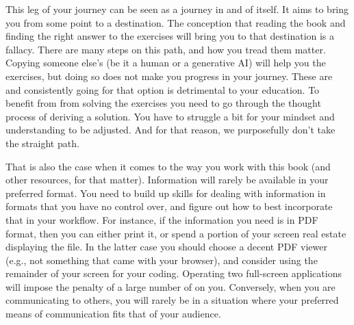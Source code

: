 This leg of your journey can be seen as a journey in and of itself. It aims to bring you from some point to a destination. The conception that reading the book and finding the right answer to the exercises will bring you to that destination is a fallacy. There are many steps on this path, and how you tread them matter.
Copying someone else's  (be it a human or a generative AI) will help you  the exercises, but doing so does not make you progress in your journey. These are  and consistently going for that option is detrimental to your education. To benefit from from solving the exercises you need to go through the thought process of deriving a solution. You have to struggle a bit for your mindset and understanding to be adjusted. And for that reason, we purposefully don't take the straight path.

That is also the case when it comes to the way you work with this book (and other resources, for that matter). Information will rarely be available in your preferred format. You need to build up skills for dealing with information in formats that you have no control over, and figure out how to best incorporate that in your workflow. For instance, if the information you need is in PDF format, then you can either print it, or spend a portion of your screen real estate displaying the file. In the latter case you should choose a decent PDF viewer (e.g., not something that came with your browser), and consider using the remainder of your screen for your coding. Operating two full-screen applications will impose the penalty of a large number of  on you. Conversely, when you are communicating to others, you will rarely be in a situation where your preferred means of communication fits that of your audience.


